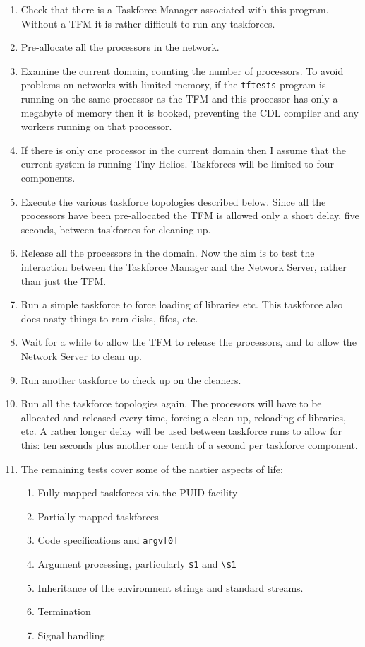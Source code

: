 \begin{enumerate}
\item Check that there is a Taskforce Manager associated with this program.
Without a TFM it is rather difficult to run any taskforces.
\item Pre-allocate all the processors in the network.
\item Examine the current domain, counting the number of processors.
To avoid problems on networks with limited memory, if the {\tt tftests}
program is running on the same processor as the TFM and this processor
has only a megabyte of memory then it is booked, preventing the CDL
compiler and any workers running on that processor.
\item If there is only one processor in the current domain then I assume
that the current system is running Tiny Helios. Taskforces will be limited
to four components.
\item Execute the various taskforce topologies described below. Since all
the processors have been pre-allocated the TFM is allowed only
a short delay, five seconds, between taskforces for cleaning-up.
\item Release all the processors in the domain.
Now the aim is to test the interaction between
the Taskforce Manager and the Network Server, rather than just the TFM.
\item Run a simple taskforce to force loading of libraries etc.
This taskforce also does nasty things to ram disks, fifos, etc.
\item Wait for a while to allow the TFM to release the processors,
and to allow the Network Server to clean up.
\item Run another taskforce to check up on the cleaners.
\item Run all the taskforce topologies again. The processors will have
to be allocated and released every time, forcing a clean-up, reloading
of libraries, etc. A rather longer delay will be used between taskforce
runs to allow for this: ten seconds plus another one tenth of a second
per taskforce component.
\item The remaining tests cover some of the nastier aspects of life:
\begin{enumerate}
\item Fully mapped taskforces via the PUID facility
\item Partially mapped taskforces
\item Code specifications and \verb+argv[0]+
\item Argument processing, particularly \verb+$1+ and \verb+\$1+
\item Inheritance of the environment strings and standard streams.
\item Termination
\item Signal handling
\end{enumerate}
\end{enumerate}

